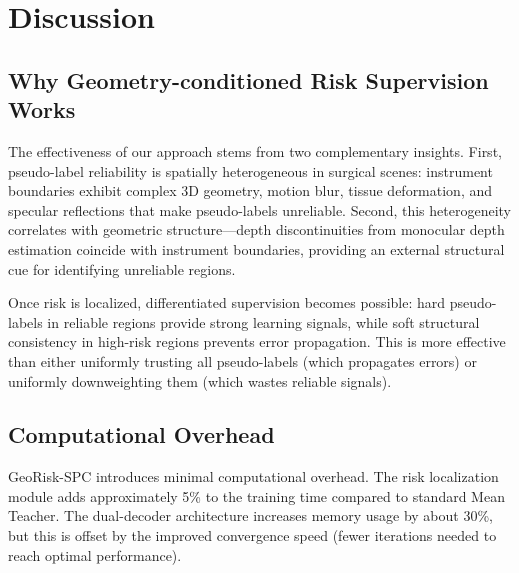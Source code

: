\documentclass[conference]{IEEEtran}
\begin{document}
\section{Discussion}

\subsection{Why Geometry-conditioned Risk Supervision Works}
The effectiveness of our approach stems from two complementary insights. First, pseudo-label reliability is spatially heterogeneous in surgical scenes: instrument boundaries exhibit complex 3D geometry, motion blur, tissue deformation, and specular reflections that make pseudo-labels unreliable. Second, this heterogeneity correlates with geometric structure—depth discontinuities from monocular depth estimation coincide with instrument boundaries, providing an external structural cue for identifying unreliable regions.

Once risk is localized, differentiated supervision becomes possible: hard pseudo-labels in reliable regions provide strong learning signals, while soft structural consistency in high-risk regions prevents error propagation. This is more effective than either uniformly trusting all pseudo-labels (which propagates errors) or uniformly downweighting them (which wastes reliable signals).

\subsection{Computational Overhead}
GeoRisk-SPC introduces minimal computational overhead. The risk localization module adds approximately 5\% to the training time compared to standard Mean Teacher. The dual-decoder architecture increases memory usage by about 30\%, but this is offset by the improved convergence speed (fewer iterations needed to reach optimal performance).
\end{document}
